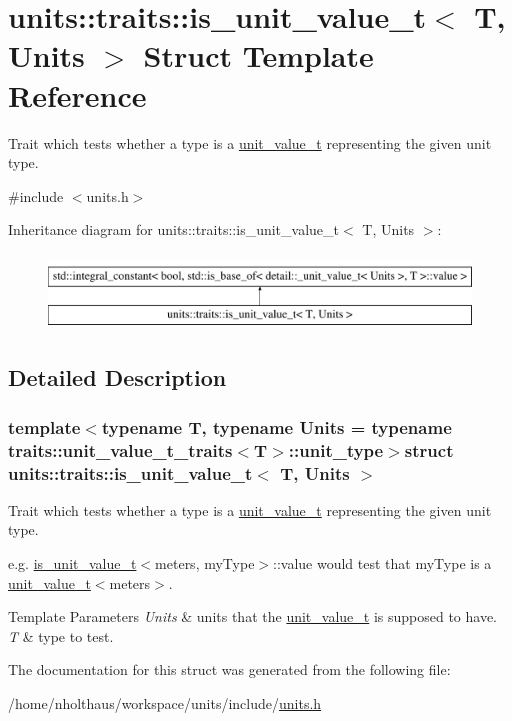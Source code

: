 \hypertarget{structunits_1_1traits_1_1is__unit__value__t}{}\section{units\+:\+:traits\+:\+:is\+\_\+unit\+\_\+value\+\_\+t$<$ T, Units $>$ Struct Template Reference}
\label{structunits_1_1traits_1_1is__unit__value__t}


Trait which tests whether a type is a \hyperlink{structunits_1_1unit__value__t}{unit\+\_\+value\+\_\+t} representing the given unit type.  




{\ttfamily \#include $<$units.\+h$>$}

Inheritance diagram for units\+:\+:traits\+:\+:is\+\_\+unit\+\_\+value\+\_\+t$<$ T, Units $>$\+:\begin{figure}[H]
\begin{center}
\leavevmode
\includegraphics[height=2.000000cm]{structunits_1_1traits_1_1is__unit__value__t}
\end{center}
\end{figure}


\subsection{Detailed Description}
\subsubsection*{template$<$typename T, typename Units = typename traits\+::unit\+\_\+value\+\_\+t\+\_\+traits$<$\+T$>$\+::unit\+\_\+type$>$struct units\+::traits\+::is\+\_\+unit\+\_\+value\+\_\+t$<$ T, Units $>$}

Trait which tests whether a type is a \hyperlink{structunits_1_1unit__value__t}{unit\+\_\+value\+\_\+t} representing the given unit type. 

e.\+g. {\ttfamily \hyperlink{structunits_1_1traits_1_1is__unit__value__t}{is\+\_\+unit\+\_\+value\+\_\+t}$<$meters, my\+Type$>$\+::value} would test that {\ttfamily my\+Type} is a {\ttfamily \hyperlink{structunits_1_1unit__value__t}{unit\+\_\+value\+\_\+t}$<$meters$>$}. 
\begin{DoxyTemplParams}{Template Parameters}
{\em Units} & units that the {\ttfamily \hyperlink{structunits_1_1unit__value__t}{unit\+\_\+value\+\_\+t}} is supposed to have. \\
\hline
{\em T} & type to test. \\
\hline
\end{DoxyTemplParams}


The documentation for this struct was generated from the following file\+:\begin{DoxyCompactItemize}
\item 
/home/nholthaus/workspace/units/include/\hyperlink{units_8h}{units.\+h}\end{DoxyCompactItemize}
